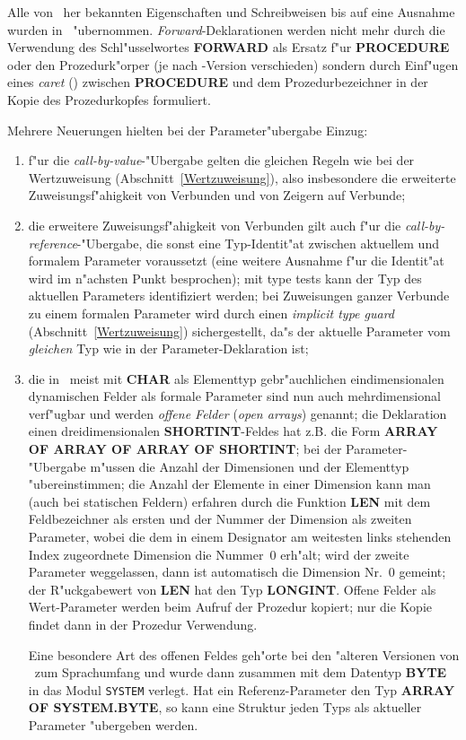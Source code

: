 Alle von \modula\ her bekannten Eigenschaften und Schreibweisen bis auf eine
Ausnahme wurden in \oberon\ "ubernommen.
{\it Forward\/}-Deklarationen werden nicht mehr durch die Verwendung des
Schl"usselwortes {\bf FORWARD} als Ersatz f"ur {\bf PROCEDURE} oder den
Prozedurk"orper (je nach \modula-Version verschieden) sondern durch
Einf"ugen eines {\em caret} ({\caret}) zwischen
{\bf PROCEDURE} und dem Prozedurbezeichner in der Kopie des Prozedurkopfes
formuliert.

\medskip
Mehrere Neuerungen hielten bei der Parameter"ubergabe Einzug:
\begin{enumerate}
\item f"ur die {\it call-by-value}-"Ubergabe gelten die gleichen Regeln wie bei
  der Wertzuweisung (Abschnitt~\ref{Wertzuweisung}), also insbesondere die
  erweiterte Zuweisungsf"ahigkeit von Verbunden und von Zeigern auf Verbunde;
\item die erweitere Zuweisungsf"ahigkeit von Verbunden gilt auch f"ur
  die {\it call-by-reference}-"Ubergabe, die sonst eine Typ-Identit"at
  zwischen aktuellem und formalem Parameter voraussetzt (eine weitere
  Ausnahme f"ur die Identit"at wird im n"achsten Punkt besprochen);
  mit type tests kann der Typ des aktuellen Parameters identifiziert werden;
  bei Zuweisungen ganzer Verbunde zu einem formalen Parameter
  wird durch einen {\it implicit type guard\/} (Abschnitt~\ref{Wertzuweisung})
  sichergestellt, da"s der aktuelle Parameter vom {\em gleichen\/} Typ wie in der
  Parameter-Deklaration ist;
\item die in \modula\ meist mit {\bf CHAR} als Elementtyp gebr"auchlichen
  eindimensionalen dynamischen Felder als formale Parameter sind nun auch
  mehrdimensional verf"ugbar und werden {\em offene Felder\/} ({\it open arrays})
  genannt;
  die Deklaration einen dreidimensionalen {\bf SHORTINT}-Feldes hat z.B.
  die Form {\bf ARRAY OF ARRAY OF ARRAY OF SHORTINT};
  bei der Parameter-"Ubergabe m"ussen die Anzahl der Dimensionen und der
  Elementtyp "ubereinstimmen;
  die Anzahl der Elemente in einer Dimension kann man (auch bei statischen
  Feldern) erfahren durch die Funktion {\bf LEN} mit dem Feldbezeichner
  als ersten und der Nummer der Dimension als zweiten Parameter, wobei
  die dem in einem Designator am weitesten links stehenden Index zugeordnete
  Dimension die Nummer~0 erh"alt;
  wird der zweite Parameter weggelassen, dann ist automatisch die Dimension
  Nr.~0 gemeint;
  der R"uckgabewert von {\bf LEN} hat den Typ {\bf LONGINT}.
  Offene Felder als Wert-Parameter werden beim Aufruf der Prozedur kopiert;
  nur die Kopie findet dann in der Prozedur Verwendung.

  Eine besondere Art des offenen Feldes geh"orte bei den "alteren Versionen
  von \oberon\ zum Sprachumfang und wurde dann zusammen mit dem Datentyp {\bf BYTE}
  in das Modul {\tt SYSTEM} verlegt.
  Hat ein Referenz-Parameter den Typ {\bf ARRAY OF SYSTEM.BYTE}, so kann eine
  Struktur jeden Typs als aktueller Parameter "ubergeben werden.
\end{enumerate}


